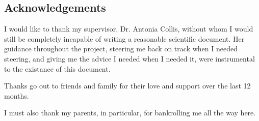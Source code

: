 \documentclass[12pt,a4paper]{report}
\begin{document}
%
%

\tableofcontents
\listoftables
\listoffigures


%
%

\begin{titlepage}
\vspace*{2in}

%
%

\section*{Acknowledgements}

I would like to thank my supervisor, Dr. Antonia Collis, without whom
I would still be completely incapable of writing a reasonable scientific
document.
%
Her guidance throughout the project, steering me back on track when I
needed steering, and giving me the advice I needed when I needed it,
were instrumental to the existance of this document.

Thanks go out to friends and family for their love and support
over the last 12 months. 

I must also thank my parents, in particular,
for bankrolling me all the way here.



\end{titlepage}




%
%









\end{document}
